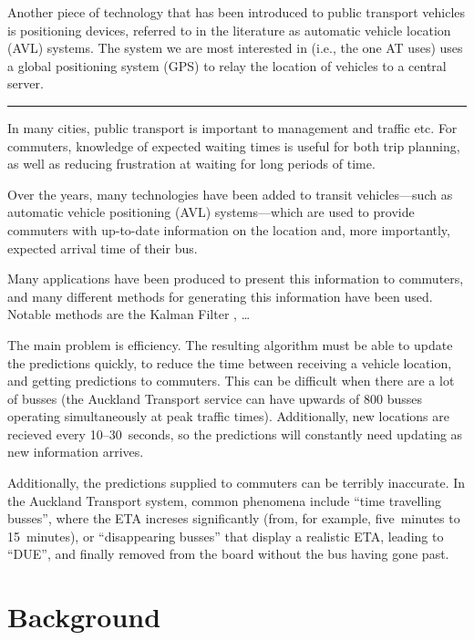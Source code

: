 \documentclass[12pt,a4paper]{article}
\begin{document}
Another piece of technology that has been introduced to public transport vehicles is positioning devices,
referred to in the literature as automatic vehicle location (AVL) systems.
The system we are most interested in (i.e., the one AT uses) 
uses a global positioning system (GPS) to relay the location of vehicles to a central server.




\vspace{1cm}
\hrule
\vspace{1cm}

In many cities, public transport is important to management and traffic etc.
For commuters, knowledge of expected waiting times is useful for both trip planning,
as well as reducing frustration at waiting for long periods of time.


Over the years, many technologies have been added to transit vehicles---such as 
automatic vehicle positioning (AVL) systems---which are used to provide commuters with
up-to-date information on the location and, more importantly, expected arrival time of their bus.


Many applications have been produced to present this information to commuters, and many different methods
for generating this information have been used.
Notable methods are the Kalman Filter \citep{cathey-dailey:2003}, \ldots


The main problem is efficiency.
The resulting algorithm must be able to update the predictions quickly, 
to reduce the time between receiving a vehicle location, and getting predictions to commuters.
This can be difficult when there are a lot of busses (the Auckland Transport service can have upwards of 800 busses operating simultaneously at peak traffic times).
Additionally, new locations are recieved every 10--30~seconds, 
so the predictions will constantly need updating as new information arrives.



Additionally, the predictions supplied to commuters can be terribly inaccurate.
In the Auckland Transport system, common phenomena include ``time travelling busses'', 
where the ETA increses significantly (from, for example, five~minutes to 15~minutes), 
or ``disappearing busses'' that display a realistic ETA, leading to ``DUE'', 
and finally removed from the board without the bus having gone past.



\section{Background}
\label{sec:background}
\end{document}
